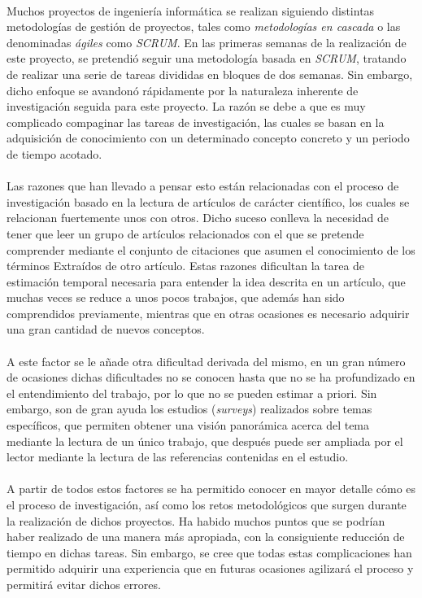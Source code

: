 \documentclass{subfiles}
\begin{document}
    \paragraph{}
    Muchos proyectos de ingeniería informática se realizan siguiendo distintas metodologías de gestión de proyectos, tales como \emph{metodologías en cascada} o las denominadas \emph{ágiles} como \emph{SCRUM}. En las primeras semanas de la realización de este proyecto, se pretendió seguir una metodología basada en \emph{SCRUM}, tratando de realizar una serie de tareas divididas en bloques de dos semanas. Sin embargo, dicho enfoque se avandonó rápidamente por la naturaleza inherente de investigación seguida para este proyecto. La razón se debe a que es muy complicado compaginar las tareas de investigación, las cuales se basan en la adquisición de conocimiento con un determinado concepto concreto y un periodo de tiempo acotado.

    \paragraph{}
    Las razones que han llevado a pensar esto están relacionadas con el proceso de investigación basado en la lectura de artículos de carácter científico, los cuales se relacionan fuertemente unos con otros. Dicho suceso conlleva la necesidad de tener que leer un grupo de artículos relacionados con el que se pretende comprender mediante el conjunto de citaciones que asumen el conocimiento de los términos Extraídos de otro artículo. Estas razones dificultan la tarea de estimación temporal necesaria para entender la idea descrita en un artículo, que muchas veces se reduce a unos pocos trabajos, que además han sido comprendidos previamente, mientras que en otras ocasiones es necesario adquirir una gran cantidad de nuevos conceptos.

    \paragraph{}
    A este factor se le añade otra dificultad derivada del mismo, en un gran número de ocasiones dichas dificultades no se conocen hasta que no se ha profundizado en el entendimiento del trabajo, por lo que no se pueden estimar a priori. Sin embargo, son de gran ayuda los estudios (\emph{surveys}) realizados sobre temas específicos, que permiten obtener una visión panorámica acerca del tema mediante la lectura de un único trabajo, que después puede ser ampliada por el lector mediante la lectura de las referencias contenidas en el estudio.

    \paragraph{}
    A partir de todos estos factores se ha permitido conocer en mayor detalle cómo es el proceso de investigación, así como los retos metodológicos que surgen durante la realización de dichos proyectos. Ha habido muchos puntos que se podrían haber realizado de una manera más apropiada, con la consiguiente reducción de tiempo en dichas tareas. Sin embargo, se cree que todas estas complicaciones han permitido adquirir una experiencia que en futuras ocasiones agilizará el proceso y permitirá evitar dichos errores.
\end{document}
